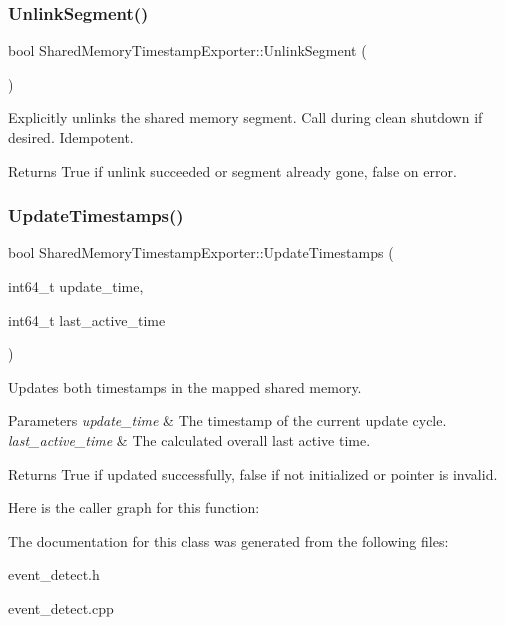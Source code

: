 \subsubsection{\texorpdfstring{Unlink\+Segment()}{UnlinkSegment()}}
{\footnotesize\ttfamily bool Shared\+Memory\+Timestamp\+Exporter\+::\+Unlink\+Segment (\begin{DoxyParamCaption}{ }\end{DoxyParamCaption})}



Explicitly unlinks the shared memory segment. Call during clean shutdown if desired. Idempotent. 

\begin{DoxyReturn}{Returns}
True if unlink succeeded or segment already gone, false on error. 
\end{DoxyReturn}
\mbox{\label{classEventDetect_1_1SharedMemoryTimestampExporter_af3f039d814ed24dde56b1d525d340a34}} 
\subsubsection{\texorpdfstring{Update\+Timestamps()}{UpdateTimestamps()}}
{\footnotesize\ttfamily bool Shared\+Memory\+Timestamp\+Exporter\+::\+Update\+Timestamps (\begin{DoxyParamCaption}\item[{int64\+\_\+t}]{update\+\_\+time,  }\item[{int64\+\_\+t}]{last\+\_\+active\+\_\+time }\end{DoxyParamCaption})}



Updates both timestamps in the mapped shared memory. 


\begin{DoxyParams}{Parameters}
{\em update\+\_\+time} & The timestamp of the current update cycle. \\
\hline
{\em last\+\_\+active\+\_\+time} & The calculated overall last active time. \\
\hline
\end{DoxyParams}
\begin{DoxyReturn}{Returns}
True if updated successfully, false if not initialized or pointer is invalid. 
\end{DoxyReturn}
Here is the caller graph for this function\+:


The documentation for this class was generated from the following files\+:\begin{DoxyCompactItemize}
\item 
event\+\_\+detect.\+h\item 
event\+\_\+detect.\+cpp\end{DoxyCompactItemize}
